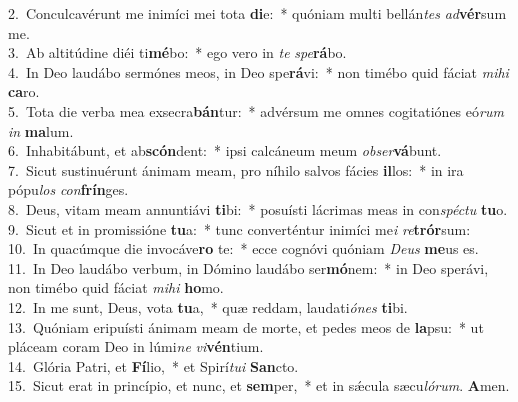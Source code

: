 {2.~}Conculcavérunt me inimíci mei tota \textbf{di}e:~* quóniam multi bellán\textit{tes} \textit{ad}\textbf{vér}sum me.\\
{3.~}Ab altitúdine diéi ti\textbf{mé}bo:~* ego vero in \textit{te} \textit{spe}\textbf{rá}bo.\\
{4.~}In Deo laudábo sermónes meos, in Deo spe\textbf{rá}vi:~* non timébo quid fáciat \textit{mi}\textit{hi} \textbf{ca}ro.\\
{5.~}Tota die verba mea exsecra\textbf{bán}tur:~* advérsum me omnes cogitatiónes eó\textit{rum} \textit{in} \textbf{ma}lum.\\
{6.~}Inhabitábunt, et ab\textbf{scón}dent:~* ipsi calcáneum meum \textit{ob}\textit{ser}\textbf{vá}bunt.\\
{7.~}Sicut sustinuérunt ánimam meam, pro níhilo salvos fácies \textbf{il}los:~* in ira pópu\textit{los} \textit{con}\textbf{frín}ges.\\
{8.~}Deus, vitam meam annuntiávi \textbf{ti}bi:~* posuísti lácrimas meas in con\textit{spé}\textit{ctu} \textbf{tu}o.\\
{9.~}Sicut et in promissióne \textbf{tu}a:~* tunc converténtur inimíci me\textit{i} \textit{re}\textbf{trór}sum:\\
{10.~}In quacúmque die invocáve\textbf{ro} te:~* ecce cognóvi quóniam \textit{De}\textit{us} \textbf{me}us es.\\
{11.~}In Deo laudábo verbum, in Dómino laudábo ser\textbf{mó}nem:~* in Deo sperávi, non timébo quid fáciat \textit{mi}\textit{hi} \textbf{ho}mo.\\
{12.~}In me sunt, Deus, vota \textbf{tu}a,~* quæ reddam, laudati\textit{ó}\textit{nes} \textbf{ti}bi.\\
{13.~}Quóniam eripuísti ánimam meam de morte, et pedes meos de \textbf{la}psu:~* ut pláceam coram Deo in lúmi\textit{ne} \textit{vi}\textbf{vén}tium.\\
{14.~}Glória Patri, et \textbf{Fí}lio,~* et Spirí\textit{tu}\textit{i} \textbf{San}cto.\\
{15.~}Sicut erat in princípio, et nunc, et \textbf{sem}per,~* et in sǽcula sæcu\textit{ló}\textit{rum}. \textbf{A}men.\\
